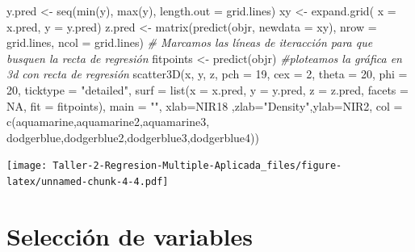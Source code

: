 \documentclass[
]{article}
\newenvironment{Shaded}{\begin{snugshade}}{\end{snugshade}}
\newcommand{\AttributeTok}[1]{\textcolor[rgb]{0.77,0.63,0.00}{#1}}
\newcommand{\CommentTok}[1]{\textcolor[rgb]{0.56,0.35,0.01}{\textit{#1}}}
\newcommand{\ConstantTok}[1]{\textcolor[rgb]{0.00,0.00,0.00}{#1}}
\newcommand{\DecValTok}[1]{\textcolor[rgb]{0.00,0.00,0.81}{#1}}
\newcommand{\FunctionTok}[1]{\textcolor[rgb]{0.00,0.00,0.00}{#1}}
\newcommand{\NormalTok}[1]{#1}
\newcommand{\OtherTok}[1]{\textcolor[rgb]{0.56,0.35,0.01}{#1}}
\newcommand{\StringTok}[1]{\textcolor[rgb]{0.31,0.60,0.02}{#1}}
\begin{document}
\begin{Shaded}
\begin{Highlighting}[]
\NormalTok{y.pred }\OtherTok{\textless{}{-}} \FunctionTok{seq}\NormalTok{(}\FunctionTok{min}\NormalTok{(y), }\FunctionTok{max}\NormalTok{(y), }\AttributeTok{length.out =}\NormalTok{ grid.lines)}
\NormalTok{xy }\OtherTok{\textless{}{-}} \FunctionTok{expand.grid}\NormalTok{( }\AttributeTok{x =}\NormalTok{ x.pred, }\AttributeTok{y =}\NormalTok{ y.pred)}
\NormalTok{z.pred }\OtherTok{\textless{}{-}} \FunctionTok{matrix}\NormalTok{(}\FunctionTok{predict}\NormalTok{(objr, }\AttributeTok{newdata =}\NormalTok{ xy), }
                 \AttributeTok{nrow =}\NormalTok{ grid.lines, }\AttributeTok{ncol =}\NormalTok{ grid.lines)}
\CommentTok{\# Marcamos las líneas de iteracción para que busquen la recta de regresión}
\NormalTok{fitpoints }\OtherTok{\textless{}{-}} \FunctionTok{predict}\NormalTok{(objr)}
\CommentTok{\#ploteamos la gráfica en 3d con recta de regresión}
\FunctionTok{scatter3D}\NormalTok{(x, y, z, }\AttributeTok{pch =} \DecValTok{19}\NormalTok{, }\AttributeTok{cex =} \DecValTok{2}\NormalTok{, }
\AttributeTok{theta =} \DecValTok{20}\NormalTok{, }\AttributeTok{phi =} \DecValTok{20}\NormalTok{, }\AttributeTok{ticktype =} \StringTok{"detailed"}\NormalTok{,}
\AttributeTok{surf =} \FunctionTok{list}\NormalTok{(}\AttributeTok{x =}\NormalTok{ x.pred, }\AttributeTok{y =}\NormalTok{ y.pred, }\AttributeTok{z =}\NormalTok{ z.pred, }
\AttributeTok{facets =} \ConstantTok{NA}\NormalTok{, }\AttributeTok{fit =}\NormalTok{ fitpoints), }\AttributeTok{main =} \StringTok{""}\NormalTok{,}
\AttributeTok{xlab=}\StringTok{\textquotesingle{}NIR18 \textquotesingle{}}\NormalTok{,}\AttributeTok{zlab=}\StringTok{"Density"}\NormalTok{,}\AttributeTok{ylab=}\StringTok{\textquotesingle{}NIR2\textquotesingle{}}\NormalTok{, }
\AttributeTok{col =} \FunctionTok{c}\NormalTok{(}\StringTok{\textquotesingle{}aquamarine\textquotesingle{}}\NormalTok{,}\StringTok{\textquotesingle{}aquamarine2\textquotesingle{}}\NormalTok{,}\StringTok{\textquotesingle{}aquamarine3\textquotesingle{}}\NormalTok{,}
\StringTok{\textquotesingle{}dodgerblue\textquotesingle{}}\NormalTok{,}\StringTok{\textquotesingle{}dodgerblue2\textquotesingle{}}\NormalTok{,}\StringTok{\textquotesingle{}dodgerblue3\textquotesingle{}}\NormalTok{,}\StringTok{\textquotesingle{}dodgerblue4\textquotesingle{}}\NormalTok{))}
\end{Highlighting}
\end{Shaded}

\texttt{[image: Taller-2-Regresion-Multiple-Aplicada\_files/figure-latex/unnamed-chunk-4-4.pdf]}

\hypertarget{selecciuxf3n-de-variables}{%
\section{Selección de variables}\label{selecciuxf3n-de-variables}}
\end{document}
